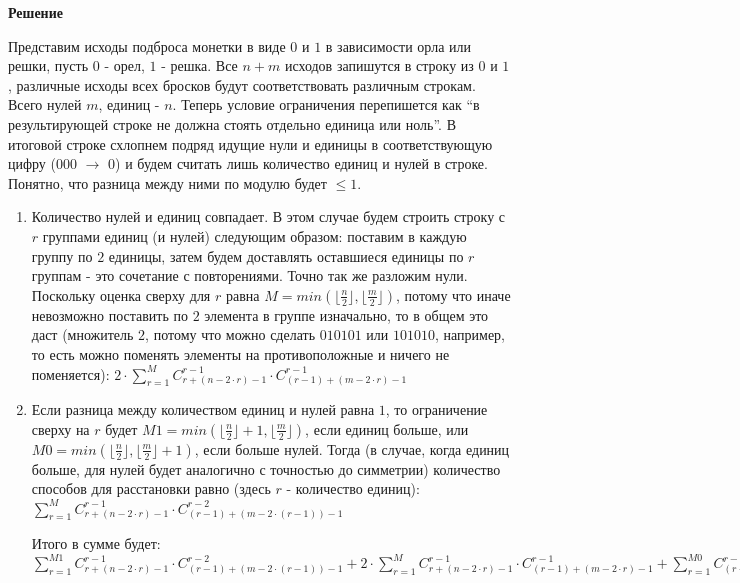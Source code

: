 \documentclass[
    11pt,
    a4paper
]{extarticle}
\begin{document}
\textbf{Решение}

Представим исходы подброса монетки в виде $0$ и $1$ в зависимости орла или решки, пусть $0$ - орел, $1$ - решка. Все $n+m$ исходов запишутся в строку из $0$ и $1$, различные исходы всех бросков будут соответствовать различным строкам. Всего нулей $m$, единиц - $n$. Теперь условие ограничения перепишется как ``в результирующей строке не должна стоять отдельно единица или ноль''. 
В итоговой строке схлопнем подряд идущие нули и единицы в соответствующую цифру ($000$ $\rightarrow$ $0$) и будем считать лишь количество единиц и нулей в строке. Понятно, что разница между ними по модулю будет $\leqslant1$.
\begin{enumerate}
\item[a)]
    Количество нулей и единиц совпадает. В этом случае будем строить строку с $r$ группами единиц (и нулей) следующим образом: поставим в каждую группу по $2$ единицы, затем будем доставлять оставшиеся единицы по $r$ группам - это сочетание с повторениями. Точно так же разложим нули. Поскольку оценка сверху для $r$ равна $M=min(\lfloor \frac{n}{2} \rfloor, \lfloor \frac{m}{2} \rfloor)$, потому что иначе невозможно поставить по $2$ элемента в группе изначально, то в общем это даст (множитель $2$, потому что можно сделать $010101$ или $101010$, например, то есть можно поменять элементы на противоположные и ничего не поменяется):
    $2 \cdot \sum_{r=1}^{M} C_{r+(n-2 \cdot r)-1}^{r-1} \cdot C_{(r-1)+(m- 2 \cdot r)-1}^{r-1}$
    
\item[b)]
    Если разница между количеством единиц и нулей равна $1$, то ограничение сверху на $r$ будет $M1=min(\lfloor \frac{n}{2} \rfloor+1, \lfloor \frac{m}{2} \rfloor)$, если единиц больше, или $M0=min(\lfloor \frac{n}{2} \rfloor, \lfloor \frac{m}{2} \rfloor+1)$, если больше нулей. Тогда (в случае, когда единиц больше, для нулей будет аналогично с точностью до симметрии) количество способов для расстановки равно (здесь $r$ - количество единиц):
    $\sum_{r=1}^{M} C_{r+(n-2 \cdot r)-1}^{r-1} \cdot C_{(r-1)+(m-2 \cdot (r-1))-1}^{r-2}$
    
Итого в сумме будет: $\sum_{r=1}^{M1} C_{r+(n-2 \cdot r)-1}^{r-1} \cdot C_{(r-1)+(m-2 \cdot (r-1))-1}^{r-2}+2 \cdot \sum_{r=1}^{M} C_{r+(n-2 \cdot r)-1}^{r-1} \cdot C_{(r-1)+(m- 2 \cdot r)-1}^{r-1}+\sum_{r=1}^{M0} C_{(r-1)+(n-2 \cdot (r-1))-1}^{r-2} \cdot C_{r+(m-2 \cdot r)-1}^{r-1}$
\end{enumerate}
\end{document}
